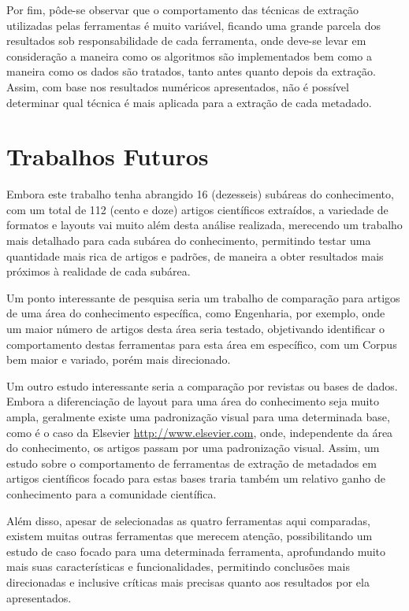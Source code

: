 Por fim, pôde-se observar que o comportamento das técnicas de extração utilizadas pelas ferramentas é muito variável, ficando uma grande parcela dos resultados sob responsabilidade de cada ferramenta, onde deve-se levar em consideração a maneira como os algoritmos são implementados bem como a maneira como os dados são tratados, tanto antes quanto depois da extração. Assim, com base nos resultados numéricos apresentados, não é possível determinar qual técnica é mais aplicada para a extração de cada metadado.

\section{Trabalhos Futuros}
\label{sec:future-work}

Embora este trabalho tenha abrangido 16 (dezesseis) subáreas do conhecimento, com um total de 112 (cento e doze) artigos científicos extraídos, a variedade de formatos e layouts vai muito além desta análise realizada, merecendo um trabalho mais detalhado para cada subárea do conhecimento, permitindo testar uma quantidade mais rica de artigos e padrões, de maneira a obter resultados mais próximos à realidade de cada subárea.

Um ponto interessante de pesquisa seria um trabalho de comparação para artigos de uma área do conhecimento específica, como Engenharia, por exemplo, onde um maior número de artigos desta área seria testado, objetivando identificar o comportamento destas ferramentas para esta área em específico, com um Corpus bem maior e variado, porém mais direcionado.

Um outro estudo interessante seria a comparação por revistas ou bases de dados. Embora a diferenciação de layout para uma área do conhecimento seja muito ampla, geralmente existe uma padronização visual para uma determinada base, como é o caso da Elsevier \url{http://www.elsevier.com}, onde, independente da área do conhecimento, os artigos passam por uma padronização visual. Assim, um estudo sobre o comportamento de ferramentas de extração de metadados em artigos científicos focado para estas bases traria também um relativo ganho de conhecimento para a comunidade científica.

Além disso, apesar de selecionadas as quatro ferramentas aqui comparadas, existem muitas outras ferramentas que merecem atenção, possibilitando um estudo de caso focado para uma determinada ferramenta, aprofundando muito mais suas características e funcionalidades, permitindo conclusões mais direcionadas e inclusive críticas mais precisas quanto aos resultados por ela apresentados.

